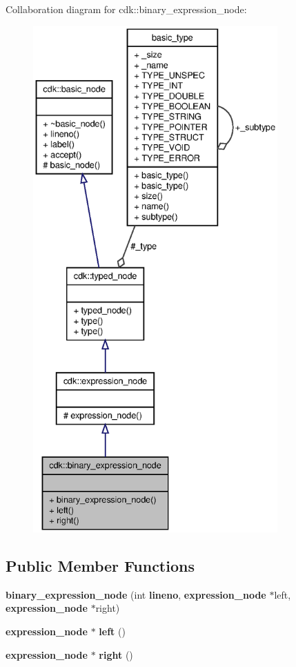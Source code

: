 Collaboration diagram for cdk\+:\+:binary\+\_\+expression\+\_\+node\+:
\nopagebreak
\begin{figure}[H]
\begin{center}
\leavevmode
\includegraphics[height=550pt]{classcdk_1_1binary__expression__node__coll__graph}
\end{center}
\end{figure}
\subsection*{Public Member Functions}
\begin{DoxyCompactItemize}
\item 
\textbf{ binary\+\_\+expression\+\_\+node} (int \textbf{ lineno}, \textbf{ expression\+\_\+node} $\ast$left, \textbf{ expression\+\_\+node} $\ast$right)
\item 
\mbox{\label{classcdk_1_1binary__expression__node_a8ac0b884a1ea56ed16d78997066d120d}} 
\textbf{ expression\+\_\+node} $\ast$ {\bfseries left} ()
\item 
\mbox{\label{classcdk_1_1binary__expression__node_a763e869d08583a828bd1b6b5433dde52}} 
\textbf{ expression\+\_\+node} $\ast$ {\bfseries right} ()
\end{DoxyCompactItemize}
